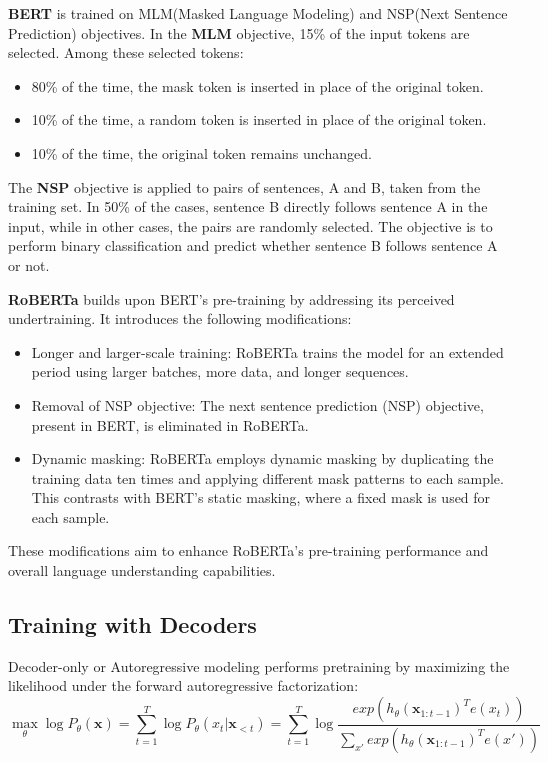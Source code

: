 \textbf{BERT} \cite{devlin2018bert} is trained on MLM(Masked Language Modeling) and NSP(Next Sentence Prediction) objectives.
In the \textbf{MLM} objective, 15\% of the input tokens are selected. Among these selected tokens:
\begin{itemize}
    \item 80\% of the time, the mask token is inserted in place of the original token.
    \item 10\% of the time, a random token is inserted in place of the original token.
    \item 10\% of the time, the original token remains unchanged.
\end{itemize}
The \textbf{NSP} objective is applied to pairs of sentences, A and B, taken from the training set. In 50\% of the cases, sentence B directly follows sentence A in the input, while in other cases, the pairs are randomly selected. The objective is to perform binary classification and predict whether sentence B follows sentence A or not.

\textbf{RoBERTa} \cite{liu2019roberta} builds upon BERT's pre-training by addressing its perceived undertraining. It introduces the following modifications:
\begin{itemize}
    \item Longer and larger-scale training: RoBERTa trains the model for an extended period using larger batches, more data, and longer sequences.
    \item Removal of NSP objective: The next sentence prediction (NSP) objective, present in BERT, is eliminated in RoBERTa.
    \item Dynamic masking: RoBERTa employs dynamic masking by duplicating the training data ten times and applying different mask patterns to each sample. This contrasts with BERT's static masking, where a fixed mask is used for each sample.
\end{itemize}
These modifications aim to enhance RoBERTa's pre-training performance and overall language understanding capabilities.




\subsection{Training with Decoders}
Decoder-only or Autoregressive modeling performs
pretraining by maximizing the likelihood under the forward autoregressive factorization:
$$
\max_{\theta} \log P_{\theta}(\textbf{x})=\sum_{t=1}^T \log P_{\theta}(x_t|\textbf{x}_{<t})
= \sum_{t=1}^T{\log\frac{exp(h_{\theta}(\textbf{x}_{1:t-1})^Te(x_t))}{\sum_{x\prime}exp(h_{\theta}(\textbf{x}_{1:t-1})^Te(x\prime))}}
$$

